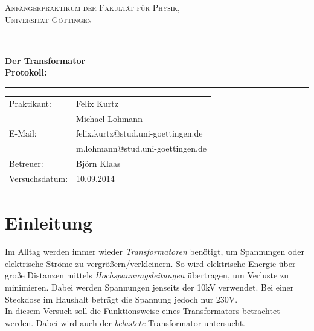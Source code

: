 \documentclass[12pt,a4paper,titlepage,headinclude,bibtotoc]{scrartcl}
\begin{document}
\begin{titlepage}
\centering
\textsc{\Large Anfängerpraktikum der Fakultät für
  Physik,\\[1.5ex] Universität Göttingen}

\vspace*{4.2cm}

\rule{\textwidth}{1pt}\\[0.5cm]
{\huge \bfseries
  Der Transformator\\[1.5ex]
  Protokoll:}\\[0.5cm]
\rule{\textwidth}{1pt}

\vspace*{3.0cm}

\begin{Large}
\begin{tabular}{ll}
Praktikant:
 	&  Felix Kurtz\\
 	&  Michael Lohmann\\

  E-Mail: 
	&  felix.kurtz@stud.uni-goettingen.de\\
	& m.lohmann@stud.uni-goettingen.de\\

 Betreuer: & Björn Klaas\\
 Versuchsdatum: & 10.09.2014\\
\end{tabular}
\end{Large}

\vspace*{0.8cm}

\begin{Large}
\end{Large}

\end{titlepage}

\tableofcontents

\newpage

\section{Einleitung}
\label{sec:einleitung}
Im Alltag werden immer wieder \textit{Transformatoren} benötigt, um Spannungen oder elektrische Ströme zu vergrößern/verkleinern.
So wird elektrische Energie über große Distanzen mittels \textit{Hochspannungsleitungen} übertragen, um Verluste zu minimieren.
Dabei werden Spannungen jenseits der 10kV verwendet.
Bei einer Steckdose im Haushalt beträgt die Spannung jedoch nur 230V.\\
In diesem Versuch soll die Funktionsweise eines Transformators betrachtet werden.
Dabei wird auch der \textit{belastete} Transformator untersucht.
\end{document}
